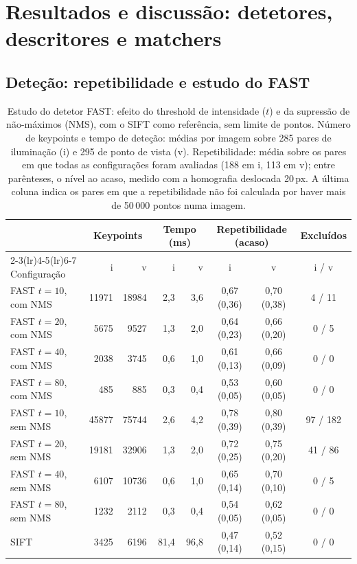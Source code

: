 \documentclass[11pt,a4paper]{article}
\newcommand{\px}{\,px}
\begin{document}
\section{Resultados e discussão: detetores, descritores e matchers} 

\subsection{Deteção: repetibilidade e estudo do FAST}
\begin{table}[H]
\centering\small
\caption{Estudo do detetor FAST: efeito do threshold de intensidade ($t$) e da supressão de não-máximos
(NMS), com o SIFT como referência, sem limite de pontos. Número de keypoints e tempo de deteção: médias
por imagem sobre 285 pares de iluminação (i) e 295 de ponto de vista (v). Repetibilidade: média sobre os
pares em que todas as configurações foram avaliadas (188 em i, 113 em v); entre parênteses, o nível ao
acaso, medido com a homografia deslocada 20\px. A última coluna indica os pares em que a repetibilidade
não foi calculada por haver mais de 50\,000 pontos numa imagem.}
\label{tab:fast}
\begin{tabular}{lrrrrccc}
\toprule
 & \multicolumn{2}{c}{Keypoints} & \multicolumn{2}{c}{Tempo (ms)} & \multicolumn{2}{c}{Repetibilidade (acaso)} & Excluídos \\
\cmidrule(lr){2-3}\cmidrule(lr){4-5}\cmidrule(lr){6-7}
Configuração & i & v & i & v & i & v & i / v \\
\midrule
FAST $t=10$, com NMS & 11971 & 18984 & 2,3 & 3,6 & 0,67 (0,36) & 0,70 (0,38) & 4 / 11 \\
FAST $t=20$, com NMS & 5675 & 9527 & 1,3 & 2,0 & 0,64 (0,23) & 0,66 (0,20) & 0 / 5 \\
FAST $t=40$, com NMS & 2038 & 3745 & 0,6 & 1,0 & 0,61 (0,13) & 0,66 (0,09) & 0 / 0 \\
FAST $t=80$, com NMS & 485 & 885 & 0,3 & 0,4 & 0,53 (0,05) & 0,60 (0,05) & 0 / 0 \\
\midrule
FAST $t=10$, sem NMS & 45877 & 75744 & 2,6 & 4,2 & 0,78 (0,39) & 0,80 (0,39) & 97 / 182 \\
FAST $t=20$, sem NMS & 19181 & 32906 & 1,3 & 2,0 & 0,72 (0,25) & 0,75 (0,20) & 41 / 86 \\
FAST $t=40$, sem NMS & 6107 & 10736 & 0,6 & 1,0 & 0,65 (0,14) & 0,70 (0,10) & 0 / 5 \\
FAST $t=80$, sem NMS & 1232 & 2112 & 0,3 & 0,4 & 0,54 (0,05) & 0,62 (0,05) & 0 / 0 \\
\midrule
SIFT & 3425 & 6196 & 81,4 & 96,8 & 0,47 (0,14) & 0,52 (0,15) & 0 / 0 \\
\bottomrule
\end{tabular}
\end{table}
\end{document}
